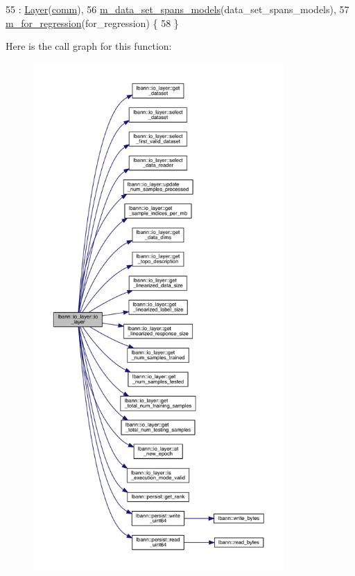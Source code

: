\begin{DoxyCode}
55     : \hyperlink{classlbann_1_1Layer_a24e9c82354a0a2af1b70cbca2211e7d4}{Layer}(\hyperlink{file__io_8cpp_ab048c6f9fcbcfaa57ce68b00263dbebe}{comm}),
56       \hyperlink{classlbann_1_1io__layer_a05c9d6e6cb12e8eb345ac6f5cb95644b}{m\_data\_set\_spans\_models}(data\_set\_spans\_models),
57       \hyperlink{classlbann_1_1io__layer_aa1410291168d197a59b47815cced48d4}{m\_for\_regression}(for\_regression) \{
58   \}
\end{DoxyCode}
Here is the call graph for this function\+:\nopagebreak
\begin{figure}[H]
\begin{center}
\leavevmode
\includegraphics[height=550pt]{classlbann_1_1io__layer_ab2b5002dfeb0806062ecf3d9fefb9948_cgraph}
\end{center}
\end{figure}


